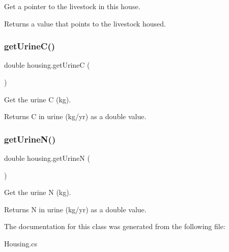 Get a pointer to the livestock in this house. 

\begin{DoxyReturn}{Returns}
a value that points to the livestock housed. 
\end{DoxyReturn}
\mbox{\label{classhousing_a03f1a9f603529c9110bb7847bcddcd48}} 
\subsubsection{\texorpdfstring{getUrineC()}{getUrineC()}}
{\footnotesize\ttfamily double housing.\+get\+UrineC (\begin{DoxyParamCaption}{ }\end{DoxyParamCaption})\hspace{0.3cm}{\ttfamily [inline]}}



Get the urine C (kg). 

\begin{DoxyReturn}{Returns}
C in urine (kg/yr) as a double value. 
\end{DoxyReturn}
\mbox{\label{classhousing_a9df8ddec2d15e3b64ad8819b03a71261}} 
\subsubsection{\texorpdfstring{getUrineN()}{getUrineN()}}
{\footnotesize\ttfamily double housing.\+get\+UrineN (\begin{DoxyParamCaption}{ }\end{DoxyParamCaption})\hspace{0.3cm}{\ttfamily [inline]}}



Get the urine N (kg). 

\begin{DoxyReturn}{Returns}
N in urine (kg/yr) as a double value. 
\end{DoxyReturn}


The documentation for this class was generated from the following file\+:\begin{DoxyCompactItemize}
\item 
Housing.\+cs\end{DoxyCompactItemize}
